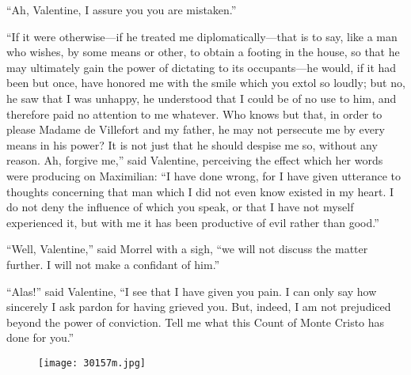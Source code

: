 “Ah, Valentine, I assure you you are mistaken.”

“If it were otherwise—if he treated me diplomatically—that is to say,
like a man who wishes, by some means or other, to obtain a footing in
the house, so that he may ultimately gain the power of dictating to its
occupants—he would, if it had been but once, have honored me with the
smile which you extol so loudly; but no, he saw that I was unhappy, he
understood that I could be of no use to him, and therefore paid no
attention to me whatever. Who knows but that, in order to please Madame
de Villefort and my father, he may not persecute me by every means in
his power? It is not just that he should despise me so, without any
reason. Ah, forgive me,” said Valentine, perceiving the effect which
her words were producing on Maximilian: “I have done wrong, for I have
given utterance to thoughts concerning that man which I did not even
know existed in my heart. I do not deny the influence of which you
speak, or that I have not myself experienced it, but with me it has
been productive of evil rather than good.”

“Well, Valentine,” said Morrel with a sigh, “we will not discuss the
matter further. I will not make a confidant of him.”

“Alas!” said Valentine, “I see that I have given you pain. I can only
say how sincerely I ask pardon for having grieved you. But, indeed, I
am not prejudiced beyond the power of conviction. Tell me what this
Count of Monte Cristo has done for you.”

\begin{figure}[ht]
\texttt{[image: 30157m.jpg]}
\end{figure}

